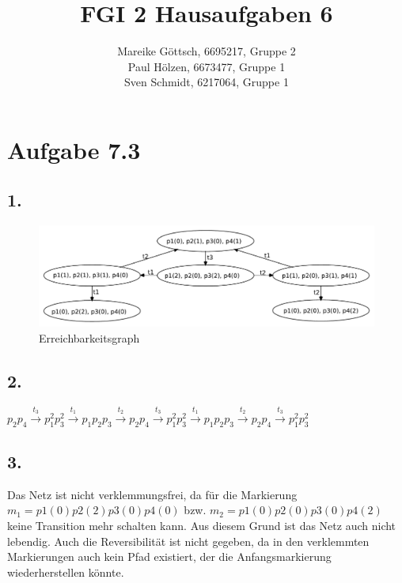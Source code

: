 \documentclass[12pt, paper=a4]{article}
\author{Mareike G\"ottsch, 6695217, Gruppe 2\\Paul H\"olzen, 6673477, Gruppe 1\\Sven Schmidt, 6217064, Gruppe 1}
\title{FGI 2 Hausaufgaben 6}
\begin{document}
\maketitle

\section*{Aufgabe 7.3}
\subsection*{1.}
\begin{figure}[h!]
\centering
\includegraphics[scale=0.6]{Erreichbarkeitsgraph7-3-1.pdf}
\caption{Erreichbarkeitsgraph}
\end{figure}

\subsection*{2.}
$p_2p_4 \overset{t_3}{\rightarrow} p_1^2p_3^2 \overset{t_1}{\rightarrow} p_1p_2p_3
\overset{t_2}{\rightarrow} p_2p_4 \overset{t_3}{\rightarrow} p_1^2p_3^2 \overset{t_1}{\rightarrow} p_1p_2p_3 \overset{t_2}{\rightarrow} p_2p_4 \overset{t_3}{\rightarrow} p_1^2p_3^2$\\

\subsection*{3.}
Das Netz ist nicht verklemmungsfrei, da für die Markierung $m_1 = p1(0)p2(2)p3(0)p4(0)$ bzw. $m_2 = p1(0)p2(0)p3(0)p4(2)$ keine Transition mehr schalten kann. Aus diesem Grund ist das Netz auch nicht lebendig. Auch die Reversibilität ist nicht gegeben, da in den verklemmten Markierungen auch kein Pfad existiert, der die Anfangsmarkierung wiederherstellen könnte.\\
\end{document}

